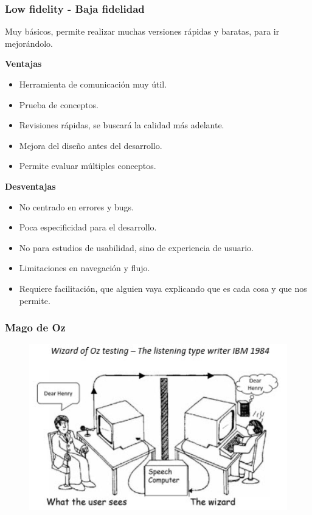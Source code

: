 \documentclass[12pt, twoside, openright]{report} %
\begin{document}
\subsubsection{Low fidelity - Baja fidelidad}
Muy básicos, permite realizar muchas versiones rápidas y baratas, para ir mejorándolo.
  
\textbf{Ventajas}
  \begin{itemize}
    \item Herramienta de comunicación muy útil.
    \item Prueba de conceptos.
    \item Revisiones rápidas, se buscará la calidad más adelante.
    \item Mejora del diseño antes del desarrollo.
    \item Permite evaluar múltiples conceptos.
  \end{itemize}

  \textbf{Desventajas}
  \begin{itemize}
    \item No centrado en errores y bugs.
    \item Poca especificidad para el desarrollo.
    \item No para estudios de usabilidad, sino de experiencia de usuario.
    \item Limitaciones en navegación y flujo.
    \item Requiere facilitación, que alguien vaya explicando que es cada cosa y que nos permite.
  \end{itemize}
  
  \subsubsection{Mago de Oz}

  \begin{figure}[H]
    {\includegraphics[scale=.4]{2021-03-20 23_48_56-L5.pdf - Foxit Reader.png}}
  \end{figure}
\end{document}
